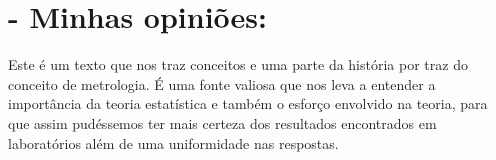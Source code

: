 \documentclass [a4paper, 12pt]{article}
\begin{document}
\section*{- Minhas opiniões:}

Este é um texto que nos traz conceitos e uma parte da história por traz do conceito de metrologia. É uma fonte valiosa que nos leva a entender a importância da teoria estatística e também o esforço envolvido na teoria, para que assim pudéssemos ter mais certeza dos resultados encontrados em laboratórios além de uma uniformidade nas respostas.
\end{document}
